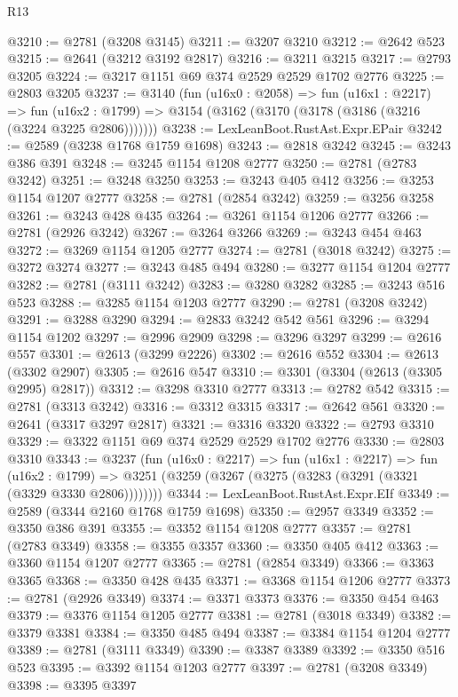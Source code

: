 \begin{lexlean}{R13}
\begin{coremodule}
@3210 := @2781 (@3208 @3145)
@3211 := @3207 @3210
@3212 := @2642 @523
@3215 := @2641 (@3212 @3192 @2817)
@3216 := @3211 @3215
@3217 := @2793 @3205
@3224 := @3217 @1151 @69 @374 @2529 @2529 @1702 @2776
@3225 := @2803 @3205
@3237 := @3140
    (fun (u16x0 : @2058) =>
    fun (u16x1 : @2217) =>
    fun (u16x2 : @1799) => @3154 (@3162 (@3170 (@3178 (@3186 (@3216 (@3224 @3225 @2806)))))))
@3238 := LexLeanBoot.RustAst.Expr.EPair
@3242 := @2589 (@3238 @1768 @1759 @1698)
@3243 := @2818 @3242
@3245 := @3243 @386 @391
@3248 := @3245 @1154 @1208 @2777
@3250 := @2781 (@2783 @3242)
@3251 := @3248 @3250
@3253 := @3243 @405 @412
@3256 := @3253 @1154 @1207 @2777
@3258 := @2781 (@2854 @3242)
@3259 := @3256 @3258
@3261 := @3243 @428 @435
@3264 := @3261 @1154 @1206 @2777
@3266 := @2781 (@2926 @3242)
@3267 := @3264 @3266
@3269 := @3243 @454 @463
@3272 := @3269 @1154 @1205 @2777
@3274 := @2781 (@3018 @3242)
@3275 := @3272 @3274
@3277 := @3243 @485 @494
@3280 := @3277 @1154 @1204 @2777
@3282 := @2781 (@3111 @3242)
@3283 := @3280 @3282
@3285 := @3243 @516 @523
@3288 := @3285 @1154 @1203 @2777
@3290 := @2781 (@3208 @3242)
@3291 := @3288 @3290
@3294 := @2833 @3242 @542 @561
@3296 := @3294 @1154 @1202
@3297 := @2996 @2909
@3298 := @3296 @3297
@3299 := @2616 @557
@3301 := @2613 (@3299 @2226)
@3302 := @2616 @552
@3304 := @2613 (@3302 @2907)
@3305 := @2616 @547
@3310 := @3301 (@3304 (@2613 (@3305 @2995) @2817))
@3312 := @3298 @3310 @2777
@3313 := @2782 @542
@3315 := @2781 (@3313 @3242)
@3316 := @3312 @3315
@3317 := @2642 @561
@3320 := @2641 (@3317 @3297 @2817)
@3321 := @3316 @3320
@3322 := @2793 @3310
@3329 := @3322 @1151 @69 @374 @2529 @2529 @1702 @2776
@3330 := @2803 @3310
@3343 := @3237
    (fun (u16x0 : @2217) =>
    fun (u16x1 : @2217) =>
    fun (u16x2 : @1799) =>
    @3251 (@3259 (@3267 (@3275 (@3283 (@3291 (@3321 (@3329 @3330 @2806))))))))
@3344 := LexLeanBoot.RustAst.Expr.EIf
@3349 := @2589 (@3344 @2160 @1768 @1759 @1698)
@3350 := @2957 @3349
@3352 := @3350 @386 @391
@3355 := @3352 @1154 @1208 @2777
@3357 := @2781 (@2783 @3349)
@3358 := @3355 @3357
@3360 := @3350 @405 @412
@3363 := @3360 @1154 @1207 @2777
@3365 := @2781 (@2854 @3349)
@3366 := @3363 @3365
@3368 := @3350 @428 @435
@3371 := @3368 @1154 @1206 @2777
@3373 := @2781 (@2926 @3349)
@3374 := @3371 @3373
@3376 := @3350 @454 @463
@3379 := @3376 @1154 @1205 @2777
@3381 := @2781 (@3018 @3349)
@3382 := @3379 @3381
@3384 := @3350 @485 @494
@3387 := @3384 @1154 @1204 @2777
@3389 := @2781 (@3111 @3349)
@3390 := @3387 @3389
@3392 := @3350 @516 @523
@3395 := @3392 @1154 @1203 @2777
@3397 := @2781 (@3208 @3349)
@3398 := @3395 @3397

\end{coremodule}
\end{lexlean}
